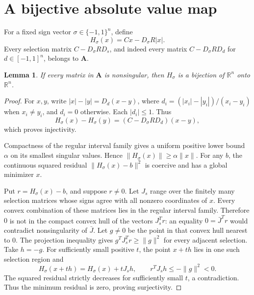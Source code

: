 \documentclass[11pt,a4paper]{article}
\newtheorem{lemma}[theorem]{Lemma}
\theoremstyle{remark}\newtheorem{remark}[theorem]{Remark}
\newcommand{\R}{\mathbb R}
\begin{document}
\section{A bijective absolute value map}
For a fixed sign vector $\sigma\in\{-1,1\}^n$, define
\[
 H_\sigma(x)=Cx-D_\sigma R|x|.
\]
Every selection matrix $C-D_\sigma RD_s$, and indeed every matrix $C-D_\sigma RD_d$ for $d\in[-1,1]^n$, belongs to $\boldsymbol A$.
\begin{lemma}\label{lem:bijective}
If every matrix in $\boldsymbol A$ is nonsingular, then $H_\sigma$ is a bijection of $\R^n$ onto $\R^n$.
\end{lemma}
\begin{proof}
For $x,y$, write $|x|-|y|=D_d(x-y)$, where $d_i=(|x_i|-|y_i|)/(x_i-y_i)$ when $x_i\ne y_i$, and $d_i=0$ otherwise. Each $|d_i|\le1$. Thus
\[
 H_\sigma(x)-H_\sigma(y)=(C-D_\sigma RD_d)(x-y),
\]
which proves injectivity.

Compactness of the regular interval family gives a uniform positive lower bound $\alpha$ on its smallest singular values. Hence $\|H_\sigma(x)\|\ge\alpha\|x\|$. For any $b$, the continuous squared residual $\|H_\sigma(x)-b\|^2$ is coercive and has a global minimizer $x$.

Put $r=H_\sigma(x)-b$, and suppose $r\ne0$. Let $J_s$ range over the finitely many selection matrices whose signs agree with all nonzero coordinates of $x$. Every convex combination of these matrices lies in the regular interval family. Therefore $0$ is not in the compact convex hull of the vectors $J_s^Tr$: an equality $0=\bar J^Tr$ would contradict nonsingularity of $\bar J$. Let $g\ne0$ be the point in that convex hull nearest to 0. The projection inequality gives $g^TJ_s^Tr\ge\|g\|^2$ for every adjacent selection. Take $h=-g$. For sufficiently small positive $t$, the point $x+th$ lies in one such selection region and
\[
 H_\sigma(x+th)=H_\sigma(x)+tJ_sh,
 \qquad r^TJ_sh\le-\|g\|^2<0.
\]
The squared residual strictly decreases for sufficiently small $t$, a contradiction. Thus the minimum residual is zero, proving surjectivity.
\end{proof}
\end{document}
